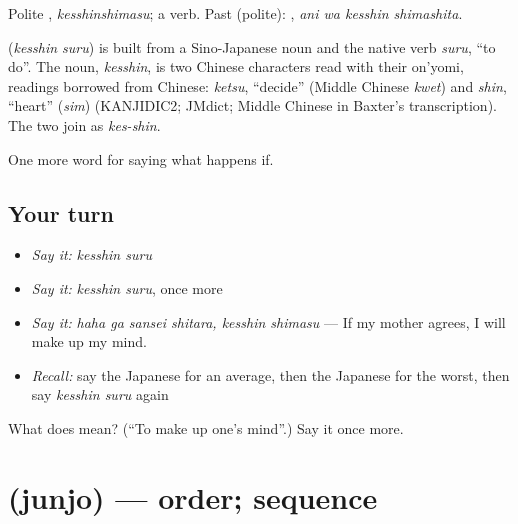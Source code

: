 Polite \textbf{}, \emph{kesshinshimasu}; a  verb. Past (polite): \textbf{ }, \emph{ani wa kesshin shimashita}.

\begin{cousinweb}
\textbf{} (\emph{kesshin suru}) is built from a Sino-Japanese noun and the native verb \emph{suru}, \textquotedblleft{}to do\textquotedblright{}. The noun, \emph{kesshin}, is two Chinese characters read with their on'yomi, readings borrowed from Chinese: \emph{ketsu}, \textquotedblleft{}decide\textquotedblright{} (Middle Chinese \emph{kwet}) and \emph{shin}, \textquotedblleft{}heart\textquotedblright{} (\emph{sim}) (KANJIDIC2; JMdict; Middle Chinese in Baxter's transcription). The two join as \emph{kes-shin}.
\end{cousinweb}

\begin{grammarlens}[title={What you've built}]
One more word for saying what happens if.
\end{grammarlens}

\subsection*{Your turn}
\begin{itemize}
\raggedright
  \item \emph{Say it:} \emph{kesshin suru}
  \item \emph{Say it:} \emph{kesshin suru}, once more
  \item \emph{Say it:} \emph{haha ga sansei shitara, kesshin shimasu} — If my mother agrees, I will make up my mind.
  \item \emph{Recall:} say the Japanese for an average, then the Japanese for the worst, then say \emph{kesshin suru} again
\end{itemize}

\begin{tcolorbox}[breakable,colback=teal!4,colframe=teal!35!black,title={Before you move on}]
What does  mean? (\textquotedblleft{}To make up one's mind\textquotedblright{}.) Say it once more.
\end{tcolorbox}
\section[\texorpdfstring{\ja{じゅんじょ} (junjo)}{じゅんじょ (junjo)}]{ (junjo) — order; sequence}

\label{lesson:JA-C366-junjo}



